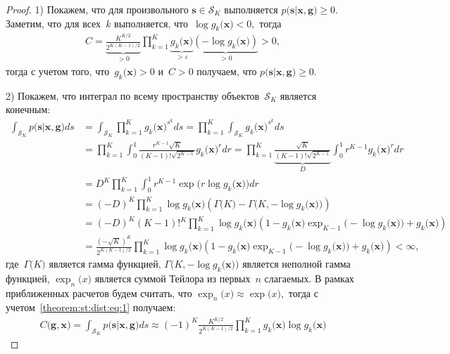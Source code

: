 \documentclass[12pt, twoside]{article}
\begin{document}
\begin{proof}
	\item[1)] Покажем, что для произвольного $\mathbf{s} \in \mathcal{S}_K$ выполняется $p\bigr(\mathbf{s}|\mathbf{x}, \mathbf{g}\bigr) \geq 0$. Заметим, что для всех~$k$ выполняется, что~$\log g_k\bigr(\mathbf{x}\bigr) < 0,$ тогда
\[
\begin{aligned}
	C=\underbrace{\frac{K^{K/2}}{2^{K(K-1)/2}}}_{>0}\prod_{k=1}^{K}\underbrace{g_k\bigr(\mathbf{x}\bigr)}_{>\varepsilon}\underbrace{\left(-\log g_k\bigr(\mathbf{x}\bigr)\right)}_{>0} > 0,
\end{aligned}
\]
тогда с учетом того, что~$g_k\bigr(\mathbf{x}\bigr) >0$ и~$C>0$ получаем, что $p\bigr(\mathbf{s}|\mathbf{x}, \mathbf{g}\bigr) \geq 0$.
	\item[2)] Покажем, что интеграл по всему пространству объектов~$\mathcal{S}_K$ является конечным:
	\[
	\label{theorem:st:dist:eq:1}
	\begin{aligned}
		\int_{\mathcal{S}_K}p\bigr(\mathbf{s}|\mathbf{x}, \mathbf{g}\bigr)ds &= \int_{\mathcal{S}_K}\prod_{k=1}^{K}g_k\bigr(\mathbf{x}\bigr)^{s^k}ds = \prod_{k=1}^{K}\int_{\mathcal{S}_K}g_k\bigr(\mathbf{x}\bigr)^{s^k}ds\\ 
		& = \prod_{k=1}^{K}\int_{0}^{1}\frac{r^{K-1}\sqrt{K}}{\left(K-1\right)!\sqrt{2^{K-1}}}g_k\bigr(\mathbf{x}\bigr)^{r}dr = \prod_{k=1}^{K}\underbrace{\frac{\sqrt{K}}{\left(K-1\right)!\sqrt{2^{K-1}}}}_{D}\int_{0}^{1}r^{K-1}g_k\bigr(\mathbf{x}\bigr)^{r}dr \\
		& = D^K\prod_{k=1}^{K} \int_{0}^{1}r^{K-1}\exp\bigr(r\log g_k\bigr(\mathbf{x}\bigr)\bigr)dr \\
		& = \left(-D\right)^K\prod_{k=1}^{K}\log g_k\bigr(\mathbf{x}\bigr)\left(\Gamma\bigr(K\bigr) - \Gamma\bigr(K, -\log g_k\bigr(\mathbf{x}\bigr)\bigr)\right) \\
		& = \left(-D\right)^K\left(K-1\right)!^K\prod_{k=1}^{K}\log g_k\bigr(\mathbf{x}\bigr)\left(1 -g_k\bigr(\mathbf{x}\bigr) \exp_{K-1}\bigr(-\log g_k\bigr(\mathbf{x}\bigr)\bigr)+g_k\bigr(\mathbf{x}\bigr)\right) \\
		& = \frac{\left(-\sqrt{K}\right)^K}{2^{K(K-1)/2}}\prod_{k=1}^{K}\log g_k\bigr(\mathbf{x}\bigr)\left(1 -g_k\bigr(\mathbf{x}\bigr) \exp_{K-1}\bigr(-\log g_k\bigr(\mathbf{x}\bigr)\bigr)+g_k\bigr(\mathbf{x}\bigr)\right) < \infty,
	\end{aligned}
	\]
где~$\Gamma\bigr(K\bigr)$ является гамма функцией, $\Gamma\bigr(K, -\log g_k\bigr(\mathbf{x}\bigr)\bigr)$ является неполной гамма функцией, $\exp_{n}\bigr(x\bigr)$ является суммой Тейлора из первых~$n$ слагаемых. В рамках приближенных расчетов будем считать, что $\exp_{n}\bigr(x\bigr)\approx\exp\bigr(x\bigr),$ тогда с учетом~\eqref{theorem:st:dist:eq:1} получаем:
	\[
	\label{theorem:st:dist:eq:2}
	\begin{aligned}
		C\bigr(\mathbf{g}, \mathbf{x}\bigr) = \int_{\mathcal{S}_K}p\bigr(\mathbf{s}|\mathbf{x}, \mathbf{g}\bigr)ds \approx \left(-1\right)^{K}\frac{K^{K/2}}{2^{K(K-1)/2}}\prod_{k=1}^{K}g_k\bigr(\mathbf{x}\bigr)\log g_k\bigr(\mathbf{x}\bigr)
	\end{aligned}
	\]
\end{proof}
	
\end{document}
